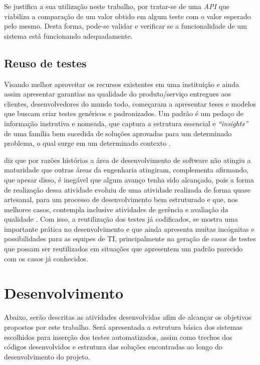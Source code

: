 \documentclass[tg]{mdtufsm}
\begin{document}
Se justifica a sua utilização neste trabalho, por tratar-se de uma \emph{API} que viabiliza a comparação de um valor obtido em algum teste com o valor esperado pelo mesmo. Desta forma, pode-se validar e verificar se a funcionalidade de um sistema está funcionando adequadamente.

\section{Reuso de testes}

Visando melhor aproveitar os recursos existentes em uma instituição e ainda assim apresentar garantias na qualidade do produto/serviço entregues aos clientes, desenvolvedores do mundo todo, começaram a apresentar
teses e modelos que buscam criar testes genéricos e padronizados. Um padrão é um pedaço de informação instrutiva e nomeada, que captura a estrutura essencial
e \emph{“insights”} de uma família bem sucedida de soluções aprovadas para um determinado problema, o qual surge em um determinado contexto \cite{cagnin2004reuso}.

\citeauthor{guizzardi2000desenvolvimento} diz que por razões histórias a área de desenvolvimento de software não atingiu a maturidade que outras áreas da engenharia atingiram, complementa afirmando,
que apesar disso, é inegável que algum avanço tenha sido alcançado, pois a forma de realização dessa atividade evoluiu de uma atividade realizada de forma quase artesanal, para um processo de
desenvolvimento bem estruturado e que, nos melhores casos, contempla inclusive atividades de gerência e avaliação da qualidade \cite{guizzardi2000desenvolvimento}.
Com isso, a reutilização dos testes já codificados, se mostra uma importante prática no desenvolvimento e que ainda apresenta muitas incógnitas e possibilidades para as equipes de TI,
principalmente na geração de casos de testes que possam ser reutilizados em situações que apresentem um padrão parecido com os casos já conhecidos.

\chapter{Desenvolvimento}

Abaixo, serão descritas as atividades desenvolvidas afim de alcançar os objetivos propostos por este trabalho. Será apresentada a estrutura básica dos sistemas escolhidos para inserção dos testes automatizados, assim como trechos dos códigos desenvolvidos e estrutura das soluções encontradas ao longo do desenvolvimento do projeto.
\end{document}
